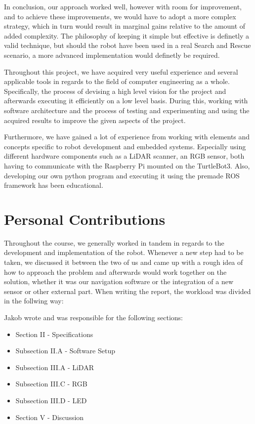 \documentclass[conference]{IEEEtran}
\begin{document}
In conclusion, our approach worked well, however with room for improvement, and to achieve these improvements, we would have to adopt a more complex strategy, which in turn would result in marginal gains relative to the amount of added complexity.
The philosophy of keeping it simple but effective is definetly a valid technique, but should the robot have been used in a real Search and Rescue scenario, a more advanced implementation would definetly be required.

Throughout this project, we have acquired very useful experience and several applicable tools in regards to the field of computer engineering as a whole.
Specifically, the process of devising a high level vision for the project and afterwards executing it efficiently on a low level basis.
During this, working with software architecture and the process of testing and experimenting and using the acquired results to improve the given aspects of the project.

Furthermore, we have gained a lot of experience from working with elements and concepts specific to robot development and embedded systems.
Especially using different hardware components such as a LiDAR scanner, an RGB sensor, both having to communicate with the Raspberry Pi mounted on the TurtleBot3.
Also, developing our own python program and executing it using the premade ROS framework has been educational.

\section{Personal Contributions}
Throughout the course, we generally worked in tandem in regards to the development and implementation of the robot.
Whenever a new step had to be taken, we discussed it between the two of us and came up with a rough idea of how to approach the problem and afterwards would work together on the solution, whether it was our navigation software or the integration of a new sensor or other external part.
When writing the report, the workload was divided in the follwing way:

Jakob wrote and was responsible for the following sections:
\begin{itemize}
    \item Section II - Specifications
    \item Subsection II.A - Software Setup
    \item Subsection III.A - LiDAR
    \item Subsection III.C - RGB
    \item Subsection III.D - LED
    \item Section V - Discussion
\end{itemize}
\end{document}
